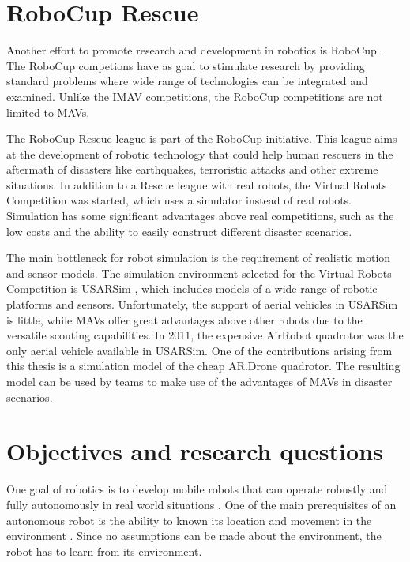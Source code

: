 	\section{RoboCup Rescue}
Another effort to promote research and development in robotics is RoboCup \cite{kitano1997robocup}.
The RoboCup competions have as goal to stimulate research by providing standard problems where wide range of technologies can be integrated and examined.
Unlike the IMAV competitions, the RoboCup competitions are not limited to MAVs.

The RoboCup Rescue league \cite{kitano1999robocup} is part of the RoboCup initiative.
This league aims at the development of robotic technology that could 
help human rescuers in the aftermath of disasters like earthquakes, terroristic attacks and other extreme situations.
In addition to a Rescue league with real robots, the Virtual Robots Competition was started, which uses a simulator instead of real robots.
Simulation has some significant advantages above real competitions, such as the low costs and the ability to easily construct different disaster scenarios.

The main bottleneck for robot simulation is the requirement of realistic motion and sensor models.
The simulation environment selected for the Virtual Robots Competition is USARSim \cite{Balakirsky2009iros,carpin2007usarsim}, which includes models of a wide range of robotic platforms and sensors.
Unfortunately, the support of aerial vehicles in USARSim is little, while MAVs offer great advantages above other robots due to the versatile scouting capabilities.
In 2011, the expensive AirRobot quadrotor was the only aerial vehicle available in USARSim.
One of the contributions arising from this thesis is a simulation model of the cheap AR.Drone quadrotor.
The resulting model can be used by teams to make use of the advantages of MAVs in disaster scenarios.


	\section{Objectives and research questions}
One goal of robotics is to develop mobile robots that can operate robustly and fully autonomously in real world situations \cite{murphy2000introduction}.
One of the main prerequisites of an autonomous robot is the ability to known its location and movement in the environment \cite{talluri1992position}.
Since no assumptions can be made about the environment, the robot has to learn from its environment.

